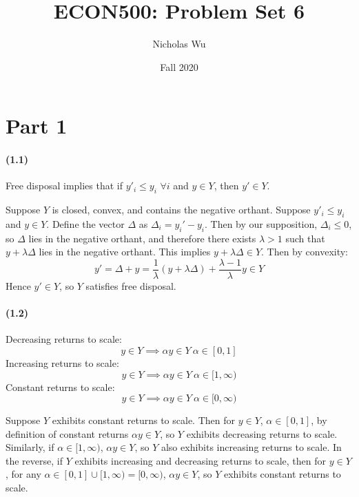 \documentclass[10pt,letter]{article}
\begin{document}


\title{ECON500: Problem Set 6}

\author{Nicholas Wu}

\date{Fall 2020}

\maketitle


\section*{Part 1}
\paragraph{(1.1)} Free disposal implies that if $y'_i \le y_i$ $\forall i$ and $y \in Y$, then $y' \in Y$.

Suppose $Y$ is closed, convex, and contains the negative orthant. Suppose $y'_i \le y_i$ and $y \in Y$. Define the vector $\Delta$ as $\Delta_i = y_i' - y_i$. Then by our supposition, $\Delta_i \le 0$, so $\Delta$ lies in the negative orthant, and therefore there exists $\lambda > 1$ such that $y + \lambda \Delta$ lies in the negative orthant. This implies $y + \lambda \Delta \in Y$. Then by convexity:
\[  y' = \Delta + y = \frac{1}{\lambda}(y + \lambda \Delta) + \frac{\lambda - 1}{\lambda} y \in Y  \]
Hence $y' \in Y$, so $Y$ satisfies free disposal.
\paragraph{(1.2)}
Decreasing returns to scale:
\[ y \in Y \implies \alpha y \in Y \ \alpha \in [0,1] \]
Increasing returns to scale:
\[ y \in Y \implies \alpha y \in Y \ \alpha \in [1,\infty) \]
Constant returns to scale:
\[ y \in Y \implies \alpha y \in Y \ \alpha \in [0,\infty) \]

Suppose $Y$ exhibits constant returns to scale. Then for $y \in Y$, $\alpha \in [0,1]$, by definition of constant returns $\alpha y \in Y$, so $Y$ exhibits decreasing returns to scale. Similarly, if $\alpha \in [1, \infty)$, $\alpha y \in Y$, so $Y$ also exhibits increasing returns to scale. In the reverse, if $Y$ exhibits increasing and decreasing returns to scale, then for $y \in Y$, for any $\alpha \in [0,1] \cup [1, \infty) = [0, \infty)$, $\alpha y \in Y$, so $Y$ exhibits constant returns to scale.
\end{document}
